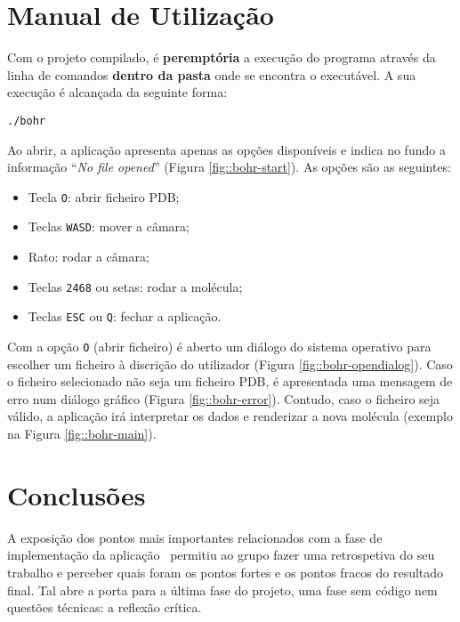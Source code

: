 \section{Manual de Utilização}
\label{sec::implement:utilizacao}

Com o projeto compilado, é \textbf{peremptória} a execução do programa através da linha de comandos \textbf{dentro da pasta} onde se encontra o executável. A sua execução é alcançada da seguinte forma:

\begin{verbatim}
./bohr
\end{verbatim}

Ao abrir, a aplicação apresenta apenas as opções disponíveis e indica no fundo a informação ``\textit{No file opened}'' (Figura \ref{fig::bohr-start}). As opções são as seguintes:

\begin{itemize}[nosep]
    \item Tecla \verb|O|: abrir ficheiro \ac{PDB};
    \item Teclas \verb|WASD|: mover a câmara;
    \item Rato: rodar a câmara;
    \item Teclas \verb|2468| ou setas: rodar a molécula;
    \item Teclas \verb|ESC| ou \verb|Q|: fechar a aplicação.
\end{itemize}

Com a opção \verb|O| (abrir ficheiro) é aberto um diálogo do sistema operativo para escolher um ficheiro à discrição do utilizador (Figura \ref{fig::bohr-opendialog}). Caso o ficheiro selecionado não seja um ficheiro \ac{PDB}, é apresentada uma mensagem de erro num diálogo gráfico (Figura \ref{fig::bohr-error}). Contudo, caso o ficheiro seja válido, a aplicação irá interpretar os dados e renderizar a nova molécula (exemplo na Figura \ref{fig::bohr-main}).



\section{Conclusões}
\label{chap3:sec:concs}

A exposição dos pontos mais importantes relacionados com a fase de implementação da aplicação \theapp~permitiu ao grupo fazer uma retrospetiva do seu trabalho e perceber quais foram os pontos fortes e os pontos fracos do resultado final. Tal abre a porta para a última fase do projeto, uma fase sem código nem questões técnicas: a reflexão crítica.



